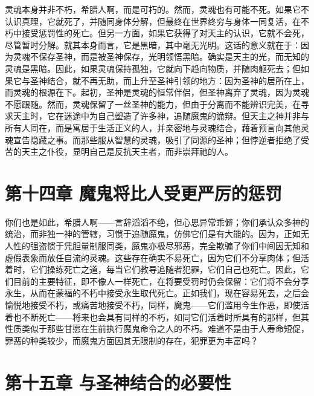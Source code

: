灵魂本身并非不朽，希腊人啊，而是可朽的。然而，灵魂也有可能不死。如果它不认识真理，它就死了，并随同身体分解，但最终在世界终穷与身体一同复活，在不朽中接受惩罚性的死亡。但另一方面，如果它获得了对天主的认识，它就不会死，尽管暂时分解。就其本身而言，它是黑暗，其中毫无光明。这话的意义就在于：因为灵魂不保存圣神，而是被圣神保存，光明领悟黑暗。确实是天主的光，而无知的灵魂是黑暗。因此，如果灵魂保持孤独，它就向下趋向物质，并随肉躯死去；但如果它与圣神结合，就不再无助，而上升至圣神引领的地方：因为圣神的居所在上，而灵魂的根源在下。起初，圣神是灵魂的恒常伴侣，但圣神离弃了灵魂，因为灵魂不愿跟随。然而，灵魂保留了一丝圣神的能力，但由于分离而不能辨识完美，在寻求天主时，它在迷途中为自己塑造了许多神，追随魔鬼的诡辩。但天主之神并非与所有人同在，而是寓居于生活正义的人，并亲密地与灵魂结合，藉着预言向其他灵魂宣告隐藏之事。而那些服从智慧的灵魂，吸引了同源的圣神；但悖逆者拒绝了受苦的天主之仆役，显明自己是反抗天主者，而非崇拜祂的人。\par


\section{第十四章 魔鬼将比人受更严厉的惩罚}

你们也是如此，希腊人啊——言辞滔滔不绝，但心思异常乖僻；你们承认众多神的统治，而非独一神的管辖，习惯于追随魔鬼，仿佛它们是有大能的。因为，正如无人性的强盗惯于凭胆量制服同类，魔鬼亦极尽邪恶，完全欺骗了你们中间因无知和虚假表象而放任自流的灵魂。这些存在确实不易死亡，因为它们不分享肉体；但活着时，它们操练死亡之道，每当它们教导追随者犯罪，它们自己也死亡。因此，它们目前的主要特征，即不像人一样死亡，在将要受罚时仍会保留：它们将不会分享永生，从而在蒙福的不朽中接受永生取代死亡。正如我们，现在容易死去，之后会愉悦地接受不朽，或痛苦地接受不朽，同样，魔鬼——它们滥用今生作恶，即使活着也不断死亡——将来也会具有同样的不朽，如同它们活着时所具有的那样，但其性质类似于那些甘愿在生前执行魔鬼命令之人的不朽。难道不是由于人寿命短促，罪恶的种类较少，而魔鬼方面因其无限制的存在，犯罪更为丰富吗？\par


\section{第十五章 与圣神结合的必要性}

